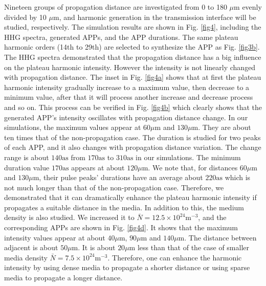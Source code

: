 \documentclass[10pt,letterpaper]{article}
\begin{document}
Nineteen groups of propagation distance are investigated from 0 to 180 $ \mu $m evenly divided by 10 $ \mu $m, and harmonic generation in the transmission interface will be studied, respectively. The simulation results are shown in Fig. \ref{fig4}, including the HHG spectra, generated APPs, and the APP durations. The same plateau harmonic orders (14th to 29th) are selected to synthesize the APP as Fig. \ref{fig3b}. The HHG spectra demonstrated that the propagation distance has a big influence on the plateau harmonic intensity. However the intensity is not linearly changed with propagation distance. The inset in Fig. \ref{fig4a} shows that at first the plateau harmonic intensity gradually increase to a maximum value, then decrease to a minimum value, after that it will process another increase and decrease process and so on. This process can be verified in Fig. \ref{fig4b} which clearly shows that the generated APP's intensity oscillates with propagation distance change. In our simulations, the maximum values appear at $60\mu\textrm{m}$ and $130\mu\textrm{m}$. They are about ten times that of the non-propagation case. The duration is studied for two peaks of each APP, and it also changes with propagation distance variation. The change range is about $140\textrm{as}$ from $170\textrm{as}$ to $310\textrm{as}$ in our simulations. The minimum duration value $170\textrm{as}$ appears at about $120\mu\textrm{m}$. We note that, for distances $60\mu\textrm{m}$ and $130\mu\textrm{m}$, their pulse peaks’ durations have an average about $220\textrm{as}$ which is not much longer than that of the non-propagation case. Therefore, we demonstrated that it can dramatically enhance the plateau harmonic intensity if propagates a suitable distance in the media. In addition to this, the medium density is also studied. We increased it to $\bar{N}=12.5\times10^{24}\textrm{m}^{-3}$, and the corresponding APPs are shown in Fig. \ref{fig4d}. It shows that the maximum intensity values appear at about $40\mu\textrm{m}$, $90\mu\textrm{m}$ and $140\mu\textrm{m}$. The distance between adjacent is about $50\mu\textrm{m}$. It is about $20\mu\textrm{m}$ less than that of the case of smaller media density $\bar{N}=7.5\times10^{24}\textrm{m}^{-3}$. Therefore, one can enhance the harmonic intensity by using dense media to propagate a shorter distance or using sparse media to propagate a longer distance.
\end{document}
